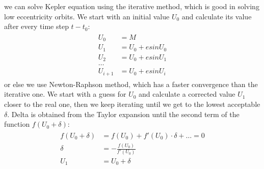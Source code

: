 \documentclass[12pt,a4paper]{article}
\begin{document}
we can solve Kepler equation using the iterative method, which is good in solving low eccentricity orbits. We start with an initial value $U_0$ and calculate its value after every time step $t-t_0$:
\begin{align}
\begin{split}
    U_0&= M \\
U_1&=U_0+e sin U_0 \\
U_2&=U_0+e sin U_1 \\
\dots\\
U_{i+ 1}&=U_0+e sinU_i
\end{split}
\end{align}
or else we use Newton-Raphson method, which has a faster convergence than the iterative one. We start with a guess for $U_0$ and calculate a corrected value $U_1$ closer to the real one, then we keep iterating until we get to the lowest acceptable $\delta$. Delta is obtained from the Taylor expansion until the second term of the function $f(U_0+\delta)$:
\begin{align}
\begin{split}
    f(U_0+\delta)&=f(U_0)+f'(U_0)\cdot\delta+\dots=0 \\
    \delta&=-\frac{f(U_0)}{f'(U_0)} \\
    U_1&=U_0+\delta
\end{split}
\end{align}
\end{document}
